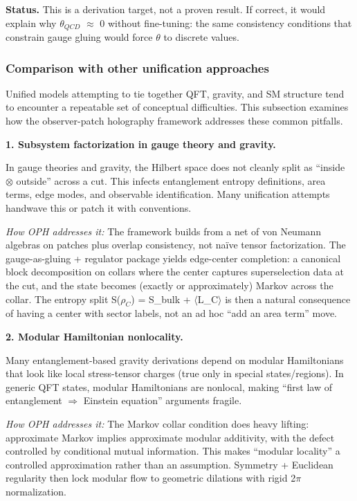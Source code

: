\documentclass[11pt,a4paper]{article}
\theoremstyle{remark}
\begin{document}
\textbf{Status.} This is a derivation target, not a proven result. If correct, it
would explain why $\theta_{QCD}$ \ensuremath{\approx} 0 without fine-tuning: the same consistency
conditions that constrain gauge gluing would force \ensuremath{\theta} to discrete values.

\subsubsection{Comparison with other unification approaches}\label{comparison-with-other-unification-approaches}

Unified models attempting to tie together QFT, gravity, and SM structure tend to encounter a repeatable set of conceptual difficulties. This subsection examines how the observer-patch holography framework addresses these common pitfalls.

\textbf{1. Subsystem factorization in gauge theory and gravity.}

In gauge theories and gravity, the Hilbert space does not cleanly split as ``inside \ensuremath{\otimes} outside'' across a cut. This infects entanglement entropy definitions, area terms, edge modes, and observable identification. Many unification attempts handwave this or patch it with conventions.

\emph{How OPH addresses it:} The framework builds from a net of von Neumann algebras on patches plus overlap consistency, not naïve tensor factorization. The gauge-as-gluing + regulator package yields edge-center completion: a canonical block decomposition on collars where the center captures superselection data at the cut, and the state becomes (exactly or approximately) Markov across the collar. The entropy split S($\rho_C$) = S\_bulk + \ensuremath{\langle}L\_C\ensuremath{\rangle} is then a natural consequence of having a center with sector labels, not an ad hoc ``add an area term'' move.

\textbf{2. Modular Hamiltonian nonlocality.}

Many entanglement-based gravity derivations depend on modular Hamiltonians that look like local stress-tensor charges (true only in special states/regions). In generic QFT states, modular Hamiltonians are nonlocal, making ``first law of entanglement \ensuremath{\Rightarrow} Einstein equation'' arguments fragile.

\emph{How OPH addresses it:} The Markov collar condition does heavy lifting: approximate Markov implies approximate modular additivity, with the defect controlled by conditional mutual information. This makes ``modular locality'' a controlled approximation rather than an assumption. Symmetry + Euclidean regularity then lock modular flow to geometric dilations with rigid 2\ensuremath{\pi} normalization.
\end{document}

